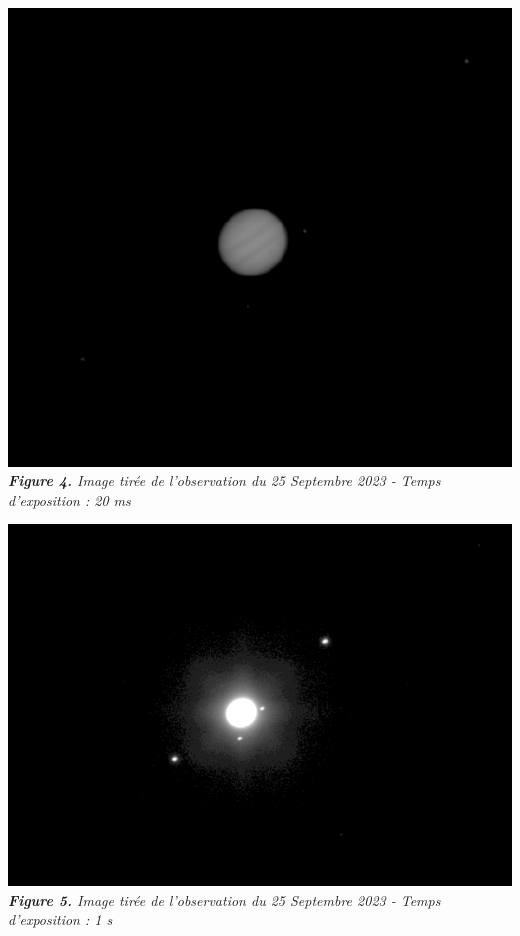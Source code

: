 \documentclass{aa}
\begin{document}
\begin{center}
    \includegraphics[scale = 0.5]{images/exemple sousexp.png} \\
    \emph{\textbf{Figure 4.} Image tirée de l'observation du 25 Septembre 2023 - Temps d'exposition : 20 ms} \break

    \includegraphics[scale = 0.5]{images/exemple surexp.png} \\
    \emph{\textbf{Figure 5.} Image tirée de l'observation du 25 Septembre 2023 - Temps d'exposition : 1 s} 
\end{center}
\end{document}
